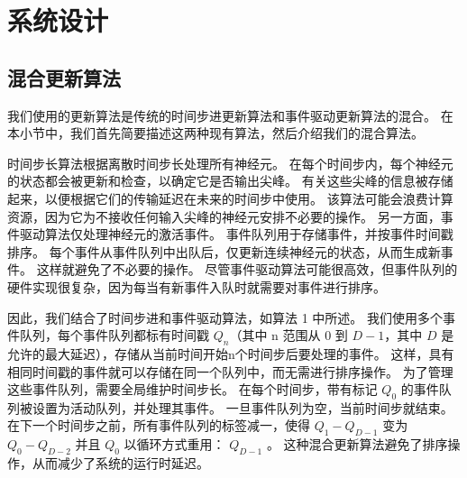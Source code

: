
\chapter{系统设计}

\section{混合更新算法}

我们使用的更新算法是传统的时间步进更新算法和事件驱动更新算法的混合。
在本小节中，我们首先简要描述这两种现有算法，然后介绍我们的混合算法。

时间步长算法根据离散时间步长处理所有神经元。 
在每个时间步内，每个神经元的状态都会被更新和检查，以确定它是否输出尖峰。
有关这些尖峰的信息被存储起来，以便根据它们的传输延迟在未来的时间步中使用。
该算法可能会浪费计算资源，因为它为不接收任何输入尖峰的神经元安排不必要的操作。
另一方面，事件驱动算法仅处理神经元的激活事件。 事件队列用于存储事件，并按事件时间戳排序。
每个事件从事件队列中出队后，仅更新连续神经元的状态，从而生成新事件。 这样就避免了不必要的操作。
尽管事件驱动算法可能很高效，但事件队列的硬件实现很复杂，因为每当有新事件入队时就需要对事件进行排序。

因此，我们结合了时间步进和事件驱动算法，如算法 1 中所述。
我们使用多个事件队列，每个事件队列都标有时间戳 $Q_n$（其中 n 范围从 $0$ 到 $D-1$，其中 $D$ 是允许的最大延迟），存储从当前时间开始n个时间步后要处理的事件。 
这样，具有相同时间戳的事件就可以存储在同一个队列中，而无需进行排序操作。 为了管理这些事件队列，需要全局维护时间步长。 
在每个时间步，带有标记 $Q_0$ 的事件队列被设置为活动队列，并处理其事件。 一旦事件队列为空，当前时间步就结束。 
在下一个时间步之前，所有事件队列的标签减一，使得 $Q_1 - Q_{D-1}$ 变为 $Q_0 - Q_{D-2}$ 并且 $Q_0$ 以循环方式重用： $Q_{D-1}$ 。 
这种混合更新算法避免了排序操作，从而减少了系统的运行时延迟。




